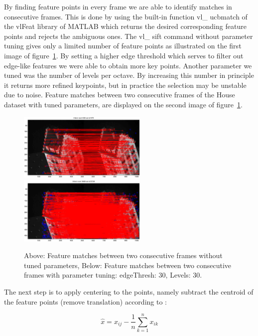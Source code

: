 By finding feature points in every frame we are able to identify matches in consecutive frames. This is done by using the built-in function vl\_ ucbmatch of the vlFeat library of MATLAB which returns the desired corresponding feature points and rejects the ambiguous ones. The vl\_ sift command without parameter tuning gives only a limited number of feature points as illustrated on the first image of figure~\ref{fig:matches}. By setting a higher edge threshold which serves to filter out edge-like features we were able to obtain more key points. Another parameter we tuned was the number of levels per octave. By increasing this number in principle it returns more refined keypoints, but in practice the selection may be unstable due to noise. Feature matches between two consecutive frames of the House dataset with tuned parameters, are displayed on the second image of figure~\ref{fig:matches}.

\begin{figure}[ht!]
  \centering
    \includegraphics[width=0.55\textwidth]{figures/matchesSimple.eps}\\
    \includegraphics[width=0.55\textwidth]{figures/matchesWithThresh.eps}
    \caption{Above: Feature matches between two consecutive frames without tuned parameters, Below: Feature matches between two consecutive frames with parameter tuning: edgeThresh: 30, Levels: 30.}
    \label{fig:matches}
\end{figure}

The next step is to apply centering to the points, namely subtract the centroid of the feature points (remove translation) according to :

\begin{equation}
\hat{x} = x_{ij} - \frac{1}{n} \sum_{k=1}^{n} x_{ik}
\end{equation}

